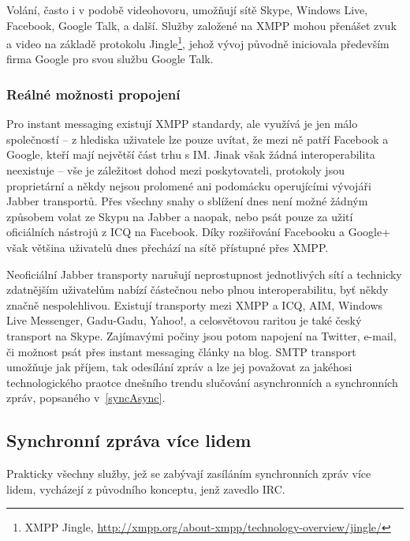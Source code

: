 \documentclass[12pt,oneside,final]{fithesis2}
\begin{document}
Volání, často i v podobě videohovoru, umožňují sítě Skype, Windows Live, Facebook, Google Talk, a další. Služby založené na XMPP mohou přenášet zvuk a video na základě protokolu Jingle\footnote{XMPP Jingle, \url{http://xmpp.org/about-xmpp/technology-overview/jingle/}}, jehož vývoj původně iniciovala především firma Google pro svou službu Google Talk.

\subsubsection*{Reálné možnosti propojení}
Pro instant messaging existují XMPP standardy, ale využívá je jen málo společností -- z hlediska uživatele lze pouze uvítat, že mezi ně patří Facebook a Google, kteří mají největší část trhu s IM. Jinak však žádná interoperabilita neexistuje -- vše je záležitost dohod mezi poskytovateli, protokoly jsou proprietární a někdy nejsou prolomené ani podomácku operujícími vývojáři Jabber transportů. Přes všechny snahy o sblížení dnes není možné žádným způsobem volat ze Skypu na Jabber a naopak, nebo psát pouze za užití oficiálních nástrojů z ICQ na Facebook. Díky rozšiřování Facebooku a Google+ však většina uživatelů dnes přechází na sítě přístupné přes XMPP.

Neoficiální Jabber transporty narušují neprostupnost jednotlivých sítí a technicky zdatnějším uživatelům nabízí částečnou nebo plnou interoperabilitu, byť někdy značně nespolehlivou. Existují transporty mezi XMPP a ICQ, AIM, Windows Live Messenger, Gadu-Gadu, Yahoo!, a celosvětovou raritou je také český transport na Skype. Zajímavými počiny jsou potom napojení na Twitter, e-mail, či možnost psát přes instant messaging články na blog. SMTP transport umožňuje jak příjem, tak odesílání zpráv a lze jej považovat za jakéhosi technologického praotce dnešního trendu slučování asynchronních a synchronních zpráv, popsaného v~\ref{syncAsync}.

\subsection{Synchronní zpráva více lidem}
Prakticky všechny služby, jež se zabývají zasíláním synchronních zpráv více lidem, vycházejí z původního konceptu, jenž zavedlo IRC.
\end{document}
